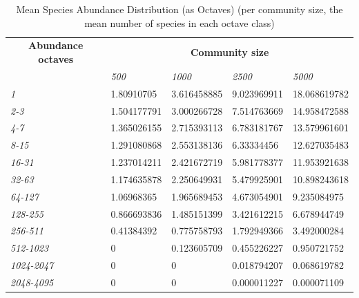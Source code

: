 \documentclass[11pt]{article}
\begin{document}
\begin{table}[]
\centering
\begin{tabular}{lllll}
\multicolumn{1}{c}{\textbf{Abundance octaves}} & \multicolumn{4}{c}{\textbf{Community size}} \\
 & \textit{500} & \textit{1000} & \textit{2500} & \textit{5000} \\
\textit{1} & 1.80910705 & 3.616458885 & 9.023969911 & 18.068619782 \\
\textit{2-3} & 1.504177791 & 3.000266728 & 7.514763669 & 14.958472588 \\
\textit{4-7} & 1.365026155 & 2.715393113 & 6.783181767 & 13.579961601 \\
\textit{8-15} & 1.291080868 & 2.553138136 & 6.33334456 & 12.627035483 \\
\textit{16-31} & 1.237014211 & 2.421672719 & 5.981778377 & 11.953921638 \\
\textit{32-63} & 1.174635878 & 2.250649931 & 5.479925901 & 10.898243618 \\
\textit{64-127} & 1.06968365 & 1.965689453 & 4.673054901 & 9.235084975 \\
\textit{128-255} & 0.866693836 & 1.485151399 & 3.421612215 & 6.678944749 \\
\textit{256-511} & 0.41384392 & 0.775758793 & 1.792949366 & 3.492000284 \\
\textit{512-1023} & 0 & 0.123605709 & 0.455226227 & 0.950721752 \\
\textit{1024-2047} & 0 & 0 & 0.018794207 & 0.068619782 \\
\textit{2048-4095} & 0 & 0 & 0.000011227 & 0.000071109
\end{tabular}%
\caption{Mean Species Abundance Distribution (as Octaves) (per community size, the mean number of species in each octave class)}
\label{my-label}
\end{table}


\clearpage
\end{document}
